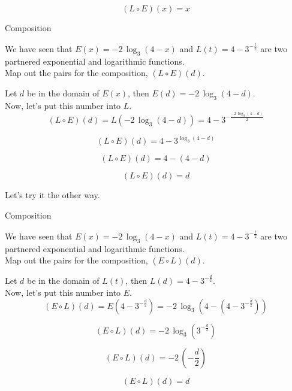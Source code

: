 \documentclass{ximera}
\begin{document}
\[   (L \circ E)(x) = x        \]




\begin{example}  Composition

We have seen that $E(x) = -2 \, \log_3(4-x)$ and $L(t) = 4 - 3^{-\frac{t}{2}}$ are two partnered exponential and logarithmic functions. \\


Map out the pairs for the composition, $(L \circ E)(d)$.

\begin{explanation}


Let $d$ be in the domain of $E(x)$, then $E(d) = -2 \, \log_3(4-d)$. \\

Now, let's put this number into $L$. \\



\[    (L \circ E)(d)  =  L(-2 \, \log_3(4-d)) = 4 - 3^{-\frac{-2 \, \log_3(4-d)}{2}}              \]


\[    (L \circ E)(d)  =  4 - 3^{ \log_3(4-d)}              \]


\[    (L \circ E)(d)  =  4 - (4-d)             \]


\[    (L \circ E)(d)  = d             \]

\end{explanation}
\end{example}




Let's try it the other way.










\begin{example}  Composition

We have seen that $E(x) = -2 \, \log_3(4-x)$ and $L(t) = 4 - 3^{-\frac{t}{2}}$ are two partnered exponential and logarithmic functions. \\



Map out the pairs for the composition, $(E \circ L)(d)$.

\begin{explanation}



Let $d$ be in the domain of $L(t)$, then $L(d) = 4 - 3^{-\frac{d}{2}}$. \\

Now, let's put this number into $E$. \\



\[    (E \circ L)(d)  =  E(4 - 3^{-\frac{d}{2}}) = -2 \, \log_3(4 - (4 - 3^{-\frac{d}{2}}))            \]


\[    (E \circ L)(d)  =  -2 \, \log_3( 3^{-\frac{d}{2}})              \]


\[    (E \circ L)(d)  = -2 \, \left(-\frac{d}{2}\right)              \]


\[    (E \circ L)(d)  = d            \]

\end{explanation}
\end{example}
\end{document}
